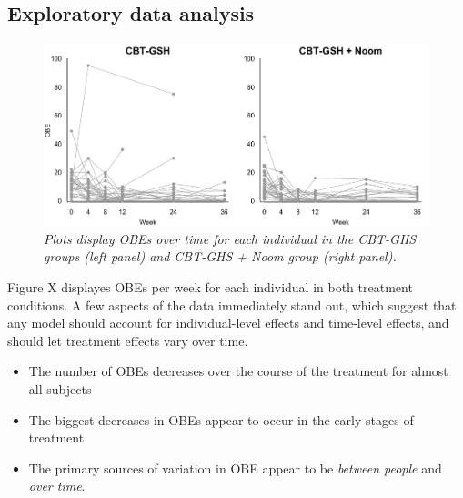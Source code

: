 \documentclass[12pt, oneside]{article}
\begin{document}
\subsection{Exploratory data analysis}

\begin{figure}
\centering
\includegraphics[width=\textwidth, height=\textheight, keepaspectratio]{Noom_paths.png}
\caption{\emph{Plots display OBEs over time for each individual in the CBT-GHS groups (left panel) and CBT-GHS + Noom group (right panel).}}
\end{figure}

Figure X displayes OBEs per week for each individual in both treatment conditions.  A few aspects of the data immediately stand out, which suggest that any model should account for individual-level effects and time-level effects, and should let treatment effects vary over time.  
\begin{itemize}
\item{The number of OBEs decreases over the course of the treatment for almost all subjects}
\item{The biggest decreases in OBEs appear to occur in the early stages of treatment}
\item{The primary sources of variation in OBE appear to be \emph{between people} and \emph{over time}.}
\end{itemize}

\newpage
\end{document}
